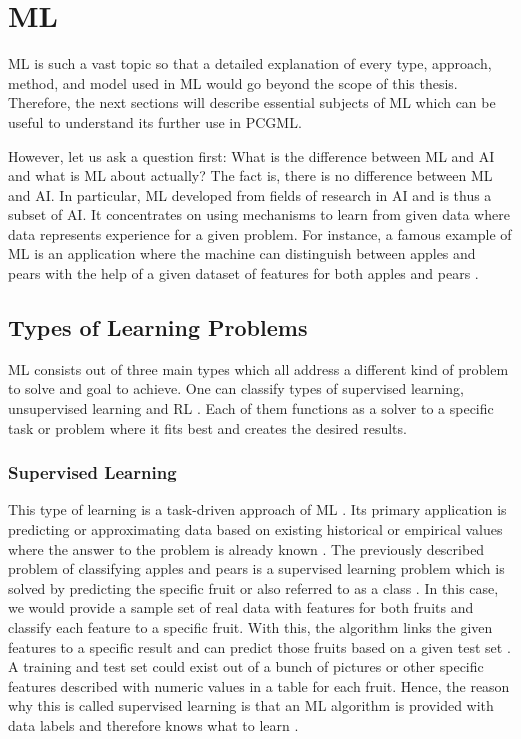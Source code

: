 \documentclass[MGS,Master,english]{twbook}%
\begin{document}
%
%
\clearpage
\chapter{\acl{ML}} \label{chapter::machineLearning}
\ac{ML} is such a vast topic so that a detailed explanation of every type, approach, method, and model used in \ac{ML} would go beyond the scope of this thesis. Therefore, the next sections will describe essential subjects of \ac{ML} which can be useful to understand its further use in \ac{PCGML}. 

However, let us ask a question first: What is the difference between \ac{ML} and \ac{AI} and what is \ac{ML} about actually? The fact is, there is no difference between \ac{ML} and \ac{AI}. In particular, \ac{ML} developed from fields of research in \ac{AI} and is thus a subset of \ac{AI}. It concentrates on using mechanisms to learn from given data where data represents experience for a given problem. For instance, a famous example of \ac{ML} is an application where the machine can distinguish between apples and pears with the help of a given dataset of features for both apples and pears \cite{ai::book}. 

\section{Types of Learning Problems}
\ac{ML} consists out of three main types which all address a different kind of problem to solve and goal to achieve. One can classify types of supervised learning, unsupervised learning and \ac{RL} \cite{ml::book::developer}. Each of them functions as a solver to a specific task or problem where it fits best and creates the desired results.

\subsection{Supervised Learning}
This type of learning is a task-driven approach of \ac{ML} \cite{ml::book::developer}. Its primary application is predicting or approximating data based on existing historical or empirical values where the answer to the problem is already known \cite{ai::book}. The previously described problem of classifying apples and pears is a supervised learning problem which is solved by predicting the specific fruit or also referred to as a class \cite{ml::book::developer}. In this case, we would provide a sample set of real data with features for both fruits and classify each feature to a specific fruit. With this, the algorithm links the given features to a specific result and can predict those fruits based on a given test set \cite{ml::book::developer}. A training and test set could exist out of a bunch of pictures or other specific features described with numeric values in a table for each fruit. Hence, the reason why this is called supervised learning is that an \ac{ML} algorithm is provided with data labels and therefore knows what to learn \cite{ai::book}.
\end{document}
